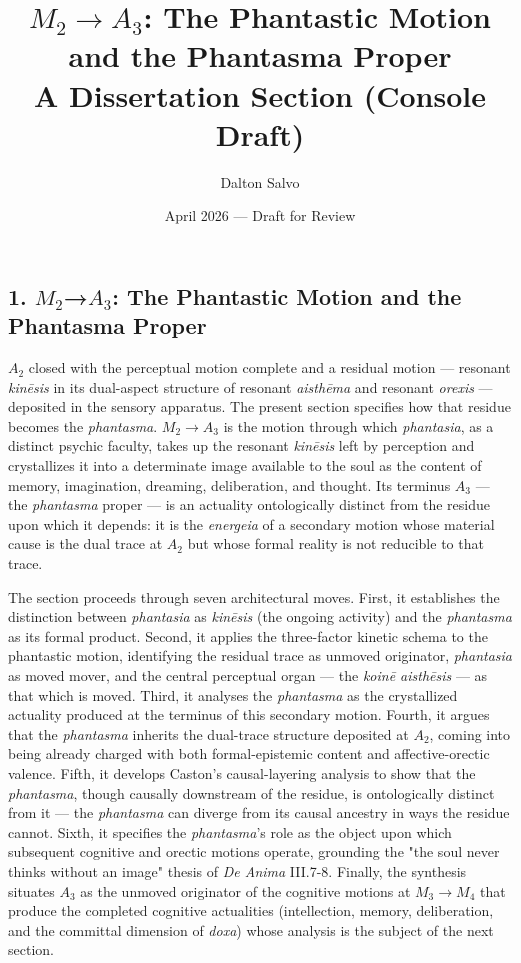 \documentclass[12pt]{article}
\title{\vspace{-2em}\textbf{$M_2 \to A_3$: The Phantastic Motion and the Phantasma Proper}\\[0.5em]
       \large\normalfont A Dissertation Section (Console Draft)}
\author{Dalton Salvo}
\date{April 2026 — Draft for Review}
\begin{document}
\maketitle

\thispagestyle{fancy}

\subsection*{1. $M_2$→$A_3$: The Phantastic Motion and the Phantasma Proper}

$A_2$ closed with the perceptual motion complete and a residual motion --- resonant \textit{kinēsis} in its dual-aspect structure of resonant \textit{aisthēma} and resonant \textit{orexis} --- deposited in the sensory apparatus. The present section specifies how that residue becomes the \textit{phantasma}. $M_2$$\to$$A_3$ is the motion through which \textit{phantasia}, as a distinct psychic faculty, takes up the resonant \textit{kinēsis} left by perception and crystallizes it into a determinate image available to the soul as the content of memory, imagination, dreaming, deliberation, and thought. Its terminus $A_3$ --- the \textit{phantasma} proper --- is an actuality ontologically distinct from the residue upon which it depends: it is the \textit{energeia} of a secondary motion whose material cause is the dual trace at $A_2$ but whose formal reality is not reducible to that trace.

The section proceeds through seven architectural moves. First, it establishes the distinction between \textit{phantasia} as \textit{kinēsis} (the ongoing activity) and the \textit{phantasma} as its formal product. Second, it applies the three-factor kinetic schema to the phantastic motion, identifying the residual trace as unmoved originator, \textit{phantasia} as moved mover, and the central perceptual organ --- the \textit{koinē aisthēsis} --- as that which is moved. Third, it analyses the \textit{phantasma} as the crystallized actuality produced at the terminus of this secondary motion. Fourth, it argues that the \textit{phantasma} inherits the dual-trace structure deposited at $A_2$, coming into being already charged with both formal-epistemic content and affective-orectic valence. Fifth, it develops Caston's causal-layering analysis to show that the \textit{phantasma}, though causally downstream of the residue, is ontologically distinct from it --- the \textit{phantasma} can diverge from its causal ancestry in ways the residue cannot. Sixth, it specifies the \textit{phantasma}'s role as the object upon which subsequent cognitive and orectic motions operate, grounding the "the soul never thinks without an image" thesis of \textit{De Anima} III.7-8. Finally, the synthesis situates $A_3$ as the unmoved originator of the cognitive motions at $M_3$$\to$$M_4$ that produce the completed cognitive actualities (intellection, memory, deliberation, and the committal dimension of \textit{doxa}) whose analysis is the subject of the next section.
\end{document}
